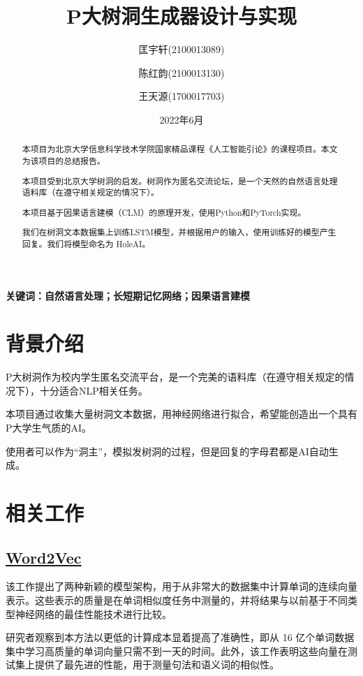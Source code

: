 \documentclass[12pt,a4paper]{article}
\title{P大树洞生成器设计与实现}
\author[1]{匡宇轩(2100013089)}
\author[1]{陈红韵(2100013130)}
\author[2]{王天源(1700017703)}
\affil[1]{北京大学信息科学技术学院}
\affil[2]{北京大学元培学院}
\date{2022年6月}
\begin{document}
\pagestyle{fancy}
\fancyhead[L]{}
\fancyhead[R]{}

\maketitle
\newpage
\renewcommand{\abstractname}{\large 摘要}
\begin{abstract}
\normalsize
    本项目为北京大学信息科学技术学院国家精品课程《人工智能引论》的课程项目。本文为该项目的总结报告。
    
    本项目受到北京大学树洞的启发。树洞作为匿名交流论坛，是一个天然的自然语言处理语料库（在遵守相关规定的情况下）。

    本项目基于因果语言建模（CLM）的原理开发，使用Python和PyTorch实现。

    我们在树洞文本数据集上训练LSTM模型，并根据用户的输入，使用训练好的模型产生回复。我们将模型命名为 HoleAI。

\end{abstract}

\textbf{关键词：自然语言处理；长短期记忆网络；因果语言建模}

\newpage
\tableofcontents


\section{背景介绍}
P大树洞作为校内学生匿名交流平台，是一个完美的语料库（在遵守相关规定的情况下），十分适合NLP相关任务。

本项目通过收集大量树洞文本数据，用神经网络进行拟合，希望能创造出一个具有P大学生气质的AI。

使用者可以作为“洞主”，模拟发树洞的过程，但是回复的字母君都是AI自动生成。
\section{相关工作}
\subsection{\href{https://arxiv.org/abs/1301.3781}{Word2Vec}}
该工作提出了两种新颖的模型架构，用于从非常大的数据集中计算单词的连续向量表示。这些表示的质量是在单词相似度任务中测量的，并将结果与以前基于不同类型神经网络的最佳性能技术进行比较。

研究者观察到本方法以更低的计算成本显着提高了准确性，即从 16 亿个单词数据集中学习高质量的单词向量只需不到一天的时间。此外，该工作表明这些向量在测试集上提供了最先进的性能，用于测量句法和语义词的相似性。\cite{ref1}
\end{document}
